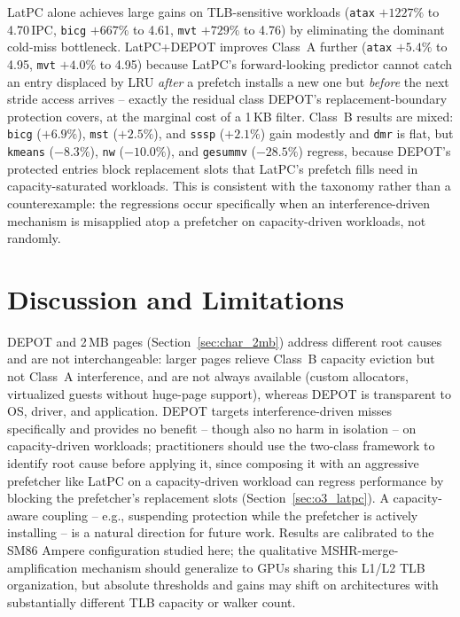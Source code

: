 LatPC alone achieves large gains on
TLB-sensitive workloads (\texttt{atax} $+1227\%$ to 4.70\,IPC, \texttt{bicg} $+667\%$ to
4.61, \texttt{mvt} $+729\%$ to 4.76) by eliminating the dominant cold-miss bottleneck.
LatPC+DEPOT improves Class~A further (\texttt{atax} $+5.4\%$ to 4.95, \texttt{mvt} $+4.0\%$
to 4.95) because LatPC's forward-looking predictor cannot catch an entry displaced by LRU
\emph{after} a prefetch installs a new one but \emph{before} the next stride access
arrives -- exactly the residual class DEPOT's replacement-boundary protection covers, at
the marginal cost of a 1\,KB filter. Class~B results are mixed: \texttt{bicg} ($+6.9\%$),
\texttt{mst} ($+2.5\%$), and \texttt{sssp} ($+2.1\%$) gain modestly and \texttt{dmr} is
flat, but \texttt{kmeans} ($-8.3\%$), \texttt{nw} ($-10.0\%$), and \texttt{gesummv}
($-28.5\%$) regress, because DEPOT's protected entries block replacement slots that
LatPC's prefetch fills need in capacity-saturated workloads. This is consistent with the
taxonomy rather than a counterexample: the regressions occur specifically when an
interference-driven mechanism is misapplied atop a prefetcher on capacity-driven
workloads, not randomly.

\section{Discussion and Limitations}
\label{sec:discussion}

DEPOT and 2\,MB pages (Section~\ref{sec:char_2mb}) address different root causes and are
not interchangeable: larger pages relieve Class~B capacity eviction but not Class~A
interference, and are not always available (custom allocators, virtualized guests without
huge-page support), whereas DEPOT is transparent to OS, driver, and application. DEPOT
targets interference-driven misses specifically and provides no benefit -- though also no
harm in isolation -- on capacity-driven workloads; practitioners should use the two-class
framework to identify root cause before applying it, since composing it with an aggressive
prefetcher like LatPC on a capacity-driven workload can regress performance by blocking
the prefetcher's replacement slots (Section~\ref{sec:o3_latpc}). A capacity-aware coupling
-- e.g., suspending protection while the prefetcher is actively installing -- is a natural
direction for future work. Results are calibrated to the SM86 Ampere configuration studied
here; the qualitative MSHR-merge-amplification mechanism should generalize to GPUs sharing
this L1/L2 TLB organization, but absolute thresholds and gains may shift on architectures
with substantially different TLB capacity or walker count.
